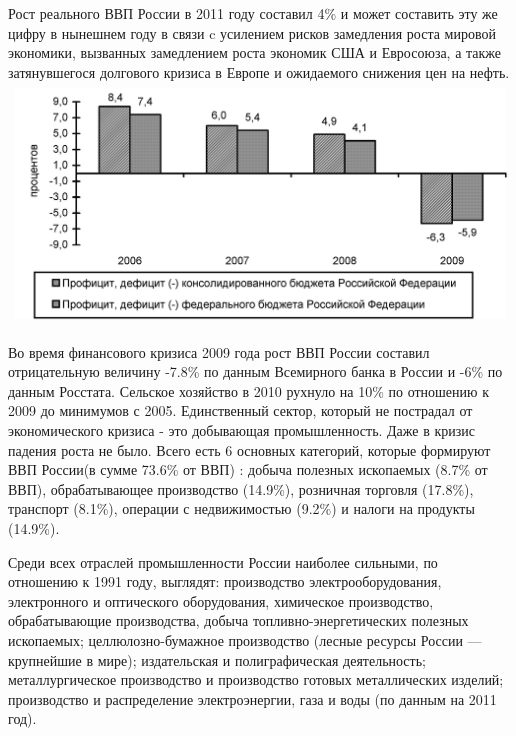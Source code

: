 \documentclass[a4paper,12pt]{article}
\begin{document}
Рост реального ВВП России в 2011 году составил 4\% и может составить эту же
цифру в нынешнем году в связи c усилением рисков замедления роста мировой
экономики, вызванных замедлением роста экономик США и Евросоюза, а также 
затянувшегося долгового кризиса в Европе и ожидаемого снижения цен на
нефть. \cite{WorldBank2011} \\
\includegraphics[width=1\textwidth]{Image3549.jpeg}

Во время финансового кризиса 2009 года рост ВВП России составил отрицательную
величину -7.8\% по данным Всемирного банка в России и -6\% по данным Росстата.
Сельское хозяйство в 2010 рухнуло на 10\% по отношению к 2009 до минимумов с
2005. Единственный сектор, который не пострадал от экономического кризиса - это 
добывающая промышленность. Даже в кризис падения роста не было. Всего есть 6 
основных категорий, которые формируют ВВП России(в сумме 73.6\%
от ВВП) :
 добыча полезных ископаемых  (8.7\% от ВВП), 
 обрабатывающее производство (14.9\%), 
 розничная торговля (17.8\%), 
 транспорт (8.1\%), 
 операции с недвижимостью (9.2\%) и 
 налоги на продукты (14.9\%).

Среди всех отраслей промышленности России наиболее сильными, по отношению к 1991
году, выглядят: производство электрооборудования, электронного и оптического оборудования, 
химическое производство, обрабатывающие производства, добыча топливно-энергетических полезных 
ископаемых; целлюлозно-бумажное производство (лесные ресурсы России — крупнейшие в мире); 
издательская и полиграфическая деятельность; металлургическое производство и производство 
готовых металлических изделий; производство и распределение электроэнергии, газа
и воды (по данным на 2011 год).
\end{document}
